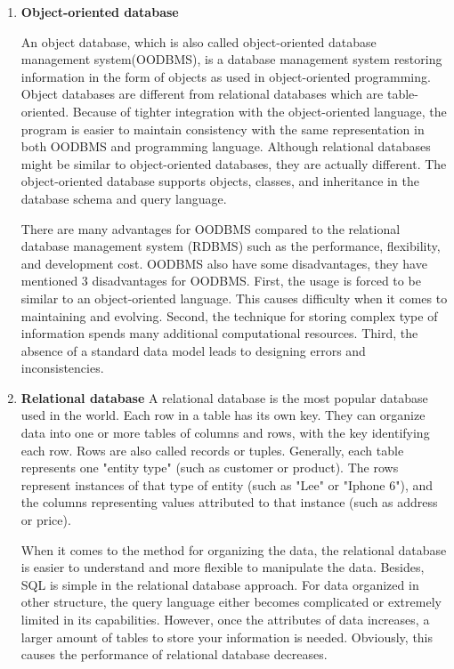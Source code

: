\begin{enumerate}
	
	
	\item\textbf{Object-oriented database}
	\setlength{\parindent}{1em}		
	
	An object database, which is also called object-oriented database management system(OODBMS), is a database management system restoring information in the form of objects as used in object-oriented programming.
	Object databases are different from relational databases which are table-oriented.
	Because of tighter integration with the object-oriented language, 
	the program is easier to maintain consistency with the same representation in both OODBMS and programming language.
	Although relational databases might be similar to object-oriented databases, they are actually different.
	The object-oriented database supports objects, classes, and inheritance in the database schema and query language.
	
	There are many advantages for OODBMS compared to the relational database management system (RDBMS) such as the performance, flexibility, and development cost.
	OODBMS also have some disadvantages, they have mentioned 3 disadvantages for OODBMS.
	First, the usage is forced to be similar to an object-oriented language.
	This causes difficulty when it comes to maintaining and evolving.
	Second, the technique for storing complex type of information spends many additional computational resources.
	Third, the absence of a standard data model leads to designing errors and inconsistencies.
	
	
	
	\item\textbf{Relational database}
	\setlength{\parindent}{1em}	
	A relational database is the most popular database used in the world.
	Each row in a table has its own key. 
	They can organize data into one or more tables of columns and rows, with the key identifying each row.
	Rows are also called records or tuples.
	Generally, each table represents one "entity type" (such as customer or product).
	The rows represent instances of that type of entity (such as "Lee" or "Iphone 6"), 
	and the columns representing values attributed to that instance (such as address or price).
	
	When it comes to the method for organizing the data, the relational database is easier to understand and more flexible to manipulate the data.
	Besides, SQL is simple in the relational database approach.
	For data organized in other structure, the query language either becomes complicated or extremely limited in its capabilities.
	However, once the attributes of data increases, a larger amount of tables to store your information is needed.
	Obviously, this causes the performance of relational database decreases.



\end{enumerate}
